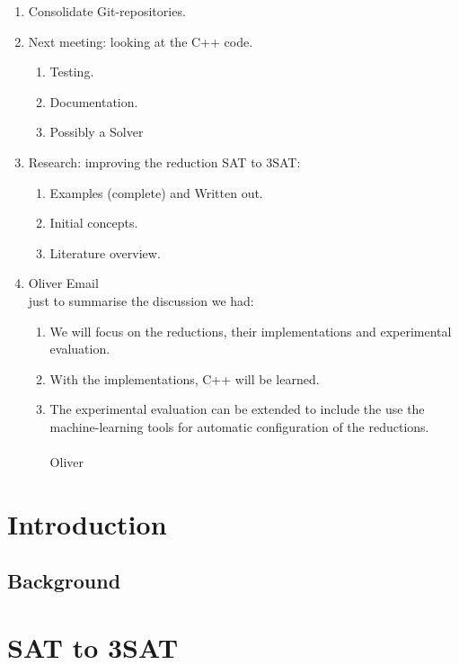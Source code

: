 \documentclass[a4paper]{report}
\begin{document}
\begin{enumerate}
\item Consolidate Git-repositories.
\item Next meeting: looking at the C++ code.
  \begin{enumerate}
  \item Testing.
  \item Documentation.
  \item Possibly a Solver
  \end{enumerate}
\item Research: improving the reduction SAT to 3SAT:
  \begin{enumerate}
  \item Examples (complete) and Written out.
  \item Initial concepts.
  \item Literature overview.
  \end{enumerate}
\item Oliver Email\\
 just to summarise the discussion we had:
  \begin{enumerate}
     \item We will focus on the reductions, their implementations and experimental evaluation.
    \item With the implementations, C++ will be learned.
    \item The experimental evaluation can be extended to include the use the machine-learning tools for automatic configuration of the reductions.\\ \\ Oliver
  \end{enumerate}
\end{enumerate}




\chapter {Introduction}
\label{cha:Introduction}

\section{Background}
\label{sec:Background}



\chapter{SAT to 3SAT}
\label{cha:sat13}
\end{document}

